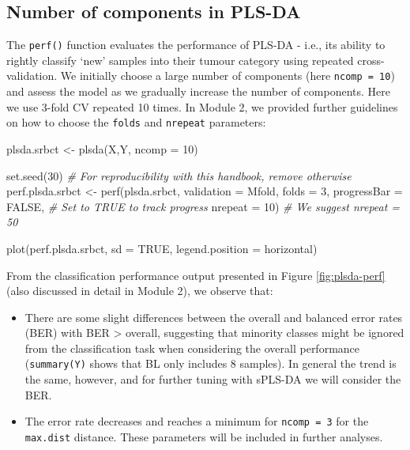 \documentclass[
]{book}
\newenvironment{Shaded}{\begin{snugshade}}{\end{snugshade}}
\newcommand{\AttributeTok}[1]{\textcolor[rgb]{0.77,0.63,0.00}{#1}}
\newcommand{\CommentTok}[1]{\textcolor[rgb]{0.56,0.35,0.01}{\textit{#1}}}
\newcommand{\ConstantTok}[1]{\textcolor[rgb]{0.00,0.00,0.00}{#1}}
\newcommand{\DecValTok}[1]{\textcolor[rgb]{0.00,0.00,0.81}{#1}}
\newcommand{\FunctionTok}[1]{\textcolor[rgb]{0.00,0.00,0.00}{#1}}
\newcommand{\NormalTok}[1]{#1}
\newcommand{\OtherTok}[1]{\textcolor[rgb]{0.56,0.35,0.01}{#1}}
\newcommand{\StringTok}[1]{\textcolor[rgb]{0.31,0.60,0.02}{#1}}
\begin{document}
\hypertarget{number-of-components-in-pls-da}{%
\subsection{Number of components in PLS-DA}\label{number-of-components-in-pls-da}}

The \texttt{perf()} function evaluates the performance of PLS-DA - i.e., its ability to rightly classify `new' samples into their tumour category using repeated cross-validation. We initially choose a large number of components (here \texttt{ncomp\ =\ 10}) and assess the model as we gradually increase the number of components. Here we use 3-fold CV repeated 10 times. In Module 2, we provided further guidelines on how to choose the \texttt{folds} and \texttt{nrepeat} parameters:

\begin{Shaded}
\begin{Highlighting}[]
\NormalTok{plsda.srbct }\OtherTok{\textless{}{-}} \FunctionTok{plsda}\NormalTok{(X,Y, }\AttributeTok{ncomp =} \DecValTok{10}\NormalTok{)}

\FunctionTok{set.seed}\NormalTok{(}\DecValTok{30}\NormalTok{) }\CommentTok{\# For reproducibility with this handbook, remove otherwise}
\NormalTok{perf.plsda.srbct }\OtherTok{\textless{}{-}} \FunctionTok{perf}\NormalTok{(plsda.srbct, }\AttributeTok{validation =} \StringTok{\textquotesingle{}Mfold\textquotesingle{}}\NormalTok{, }\AttributeTok{folds =} \DecValTok{3}\NormalTok{, }
                  \AttributeTok{progressBar =} \ConstantTok{FALSE}\NormalTok{,  }\CommentTok{\# Set to TRUE to track progress}
                  \AttributeTok{nrepeat =} \DecValTok{10}\NormalTok{)         }\CommentTok{\# We suggest nrepeat = 50}

\FunctionTok{plot}\NormalTok{(perf.plsda.srbct, }\AttributeTok{sd =} \ConstantTok{TRUE}\NormalTok{, }\AttributeTok{legend.position =} \StringTok{\textquotesingle{}horizontal\textquotesingle{}}\NormalTok{)}
\end{Highlighting}
\end{Shaded}



From the classification performance output presented in Figure \ref{fig:plsda-perf} (also discussed in detail in Module 2), we observe that:

\begin{itemize}
\item
  There are some slight differences between the overall and balanced error rates (BER) with BER \textgreater{} overall, suggesting that minority classes might be ignored from the classification task when considering the overall performance (\texttt{summary(Y)} shows that BL only includes 8 samples). In general the trend is the same, however, and for further tuning with sPLS-DA we will consider the BER.
\item
  The error rate decreases and reaches a minimum for \texttt{ncomp\ =\ 3} for the \texttt{max.dist} distance. These parameters will be included in further analyses.
\end{itemize}
\end{document}
